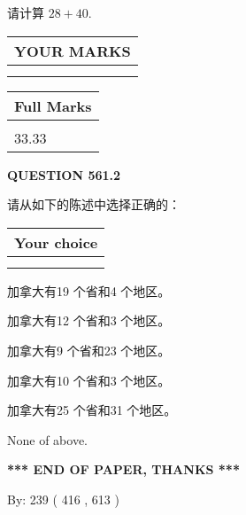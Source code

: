 \documentclass{ctexart}
\begin{document}
  
 
请计算 $ %
28 +  %
40 $.
 

 

 
  
\vspace{0.2in}
  
\noindent\begin{tabular}{|l|}
\hline
 YOUR MARKS  \\
\hline
 \\ 
 \\ 
\hline
\end{tabular}
\hspace{0.05in} \begin{tabular}{|l|}
\hline
 Full Marks  \\
\hline
 \\ 
33.33 \\
\hline
\end{tabular}
{\textbf{\Large{QUESTION
561.2 
}}}
  
  
请从如下的陈述中选择正确的：
  
  
\noindent\hspace{3.0in} \begin{tabular}{|l|}
\hline
Your choice \\
\hline
 \\ 
 \\ 
\hline
\end{tabular}
  
  
 
 
加拿大有19 个省和4 个地区。
 
 
加拿大有12 个省和3 个地区。
 
 
加拿大有9 个省和23 个地区。
 
 
加拿大有10 个省和3 个地区。
 
 
加拿大有25 个省和31 个地区。
 
 
 None of above.
 
 
   
   
 \vspace{0.2in}
 
   
   
   
   
\vspace{1.0in} 
{\textbf{\large{ *** END OF PAPER, THANKS *** }}} 
   
   
\hspace{1.0in} By: 
 239 ( 416 ,  613 )
   
\end{document}
